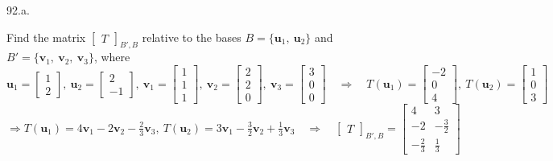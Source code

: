 \documentclass[12pt]{book}
\begin{document}
\begin{CJK}{UTF8}{bsmi}
92.a. \begin{minipage}[t]{\dimexpr\linewidth-2em}
Find the matrix $\begin{bmatrix}
T
\end{bmatrix}_{B',B}$ relative to the bases $B=\{\textbf{u}_1,\ \textbf{u}_2\}$ and $B'=\{\textbf{v}_1,\ \textbf{v}_2,\ \textbf{v}_3\}$, where \\
$\textbf{u}_1=\begin{bmatrix}
1\\2
\end{bmatrix},\ \textbf{u}_2=\begin{bmatrix}
2\\-1
\end{bmatrix},\ \textbf{v}_1=\begin{bmatrix}
1\\1\\1
\end{bmatrix},\ \textbf{v}_2=\begin{bmatrix}
2\\2\\0
\end{bmatrix},\ \textbf{v}_3=\begin{bmatrix}
3\\0\\0
\end{bmatrix}\quad\Rightarrow\quad T(\textbf{u}_1)=\begin{bmatrix}
-2\\0\\4
\end{bmatrix},\ T(\textbf{u}_2)=\begin{bmatrix}
1\\0\\3
\end{bmatrix}$ \\
$\displaystyle\Rightarrow T(\textbf{u}_1)=4\textbf{v}_1-2\textbf{v}_2-\frac{2}{3}\textbf{v}_3,\ T(\textbf{u}_2)=3\textbf{v}_1-\frac{3}{2}\textbf{v}_2+\frac{1}{3}\textbf{v}_3\quad\Rightarrow\quad\begin{bmatrix}
T
\end{bmatrix}_{B',B}=\begin{bmatrix}
4 & 3 \\ -2 & -\frac{3}{2} \\ -\frac{2}{3} & \frac{1}{3}
\end{bmatrix}$
\end{minipage}\\


\end{CJK}
\end{document}
